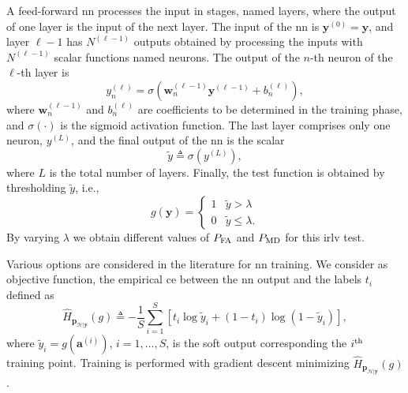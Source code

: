 \documentclass[conference,draftcls,onecolumn]{IEEEtran}
\newcommand{\hatcross}[2]{\hat{H}_{#1}(#2)}
\begin{document}
A feed-forward \ac{nn} processes the input in stages, named layers, where the output of one layer is the input of the next layer. The input of the \ac{nn} is $\bm{y}^{(0)} = \bm{y}$, and layer $\ell-1$ has $N^{(\ell-1)}$ outputs obtained by processing the inputs with $N^{(\ell-1)}$ scalar functions named neurons. The output of the $n$-th neuron of the $\ell$-th layer is
\begin{equation}\label{eq:nonLin}
y_n^{(\ell)} = \sigma\left( \bm{w}_n^{(\ell -1)}\bm{y}^{(\ell-1)}+b_n^{(\ell)} \right),
\end{equation}
where $\bm{w}_n^{(\ell -1)}$ and $b_n^{(\ell)}$ are coefficients to be determined in the training phase, and $\sigma(\cdot)$ is the sigmoid activation function. 
The last layer comprises only one neuron, $y^{(L)}$, and the final output of the \ac{nn} is the scalar 
\begin{equation}
	\tilde{y} \triangleq \sigma(y^{(L)}),	
\end{equation}
where $L$ is the total number of layers. Finally, the test function is obtained by thresholding $\tilde{y}$, i.e.,
\begin{equation}
\label{eq:decNN}
    g(\bm{y}) = \begin{cases}
    1 & \tilde{y} > \lambda \\
    0 & \tilde{y} \leq \lambda.
    \end{cases}
\end{equation}
By varying $\lambda$ we obtain different values of $P_{\rm FA}$ and $P_{\rm MD}$ for this \ac{irlv} test.

Various options are considered in the literature for \ac{nn} training. We consider as objective function, the empirical \ac{ce} between the \ac{nn} output and the labels $t_i$ defined as
\begin{equation}\label{eq:ce}
\hatcross{\bm p_{\mathcal{H}|\bm y}}{g} \triangleq -\frac{1}{S} \sum_{i=1}^{S}\left[t_i\log \tilde{y}_i +\left(1-t_i\right)\log\left(1-\tilde{y}_i\right)\right],
\end{equation}
where $\tilde{y}_i = g(\bm a^{(i)})$, $i=1, \ldots, S$, is the soft output corresponding the $i^{\rm th}$  training point. Training is performed with gradient descent minimizing $\hatcross{\bm p_{\mathcal{H}|\bm y}}{g}$.
\end{document}
